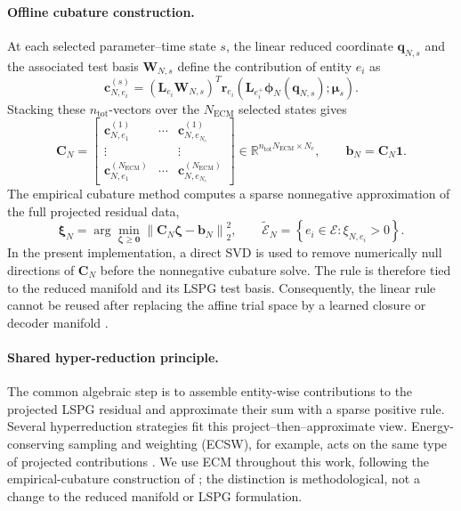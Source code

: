 \documentclass[11pt]{article}
\begin{document}
\paragraph{Offline cubature construction.}
At each selected parameter--time state $s$, the linear reduced coordinate
$\mathbf q_{N,s}$ and the associated test basis $\mathbf W_{N,s}$ define the
contribution of entity $e_i$ as
\begin{equation}
\mathbf c_{N,e_i}^{(s)}
=
\left(\mathbf L_{e_i}\mathbf W_{N,s}\right)^T
\mathbf r_{e_i}
\!\left(\mathbf L_{e_i^+}\boldsymbol\phi_N(\mathbf q_{N,s});\bm\mu_s\right).
\label{eq:linear-ecm-training-contribution}
\end{equation}
Stacking these $n_{\mathrm{tot}}$-vectors over the $N_{\mathrm{ECM}}$
selected states gives
\begin{equation}
\mathbf C_N=
\begin{bmatrix}
\mathbf c_{N,e_1}^{(1)} & \cdots & \mathbf c_{N,e_{N_e}}^{(1)}\\
\vdots & & \vdots\\
\mathbf c_{N,e_1}^{(N_{\mathrm{ECM}})} & \cdots &
\mathbf c_{N,e_{N_e}}^{(N_{\mathrm{ECM}})}
\end{bmatrix}
\in\mathbb R^{n_{\mathrm{tot}}N_{\mathrm{ECM}}\times N_e},
\qquad
\mathbf b_N=\mathbf C_N\mathbf 1.
\label{eq:linear-ecm-training-matrix}
\end{equation}
The empirical cubature method computes a sparse nonnegative approximation of
the full projected residual data,
\begin{equation}
\boldsymbol\xi_N
=
\arg\min_{\boldsymbol\zeta\geq\mathbf0}
\left\|\mathbf C_N\boldsymbol\zeta-\mathbf b_N\right\|_2^2,
\qquad
\widetilde{\mathcal E}_N
=\left\{e_i\in\mathcal E:\xi_{N,e_i}>0\right\}.
\label{eq:linear-ecm-cubature}
\end{equation}
In the present implementation, a direct SVD is used to remove numerically
null directions of $\mathbf C_N$ before the nonnegative cubature solve. The
rule is therefore tied to the reduced manifold and its LSPG test basis.
Consequently, the linear rule cannot be reused after replacing the affine
trial space by a learned closure or decoder manifold
\cite{hernandez2017dimensional,hernandez2020multiscale,de2023hyper,ares2026closure}.

\paragraph{Shared hyper-reduction principle.}
The common algebraic step is to assemble entity-wise contributions to the
projected LSPG residual and approximate their sum with a sparse positive
rule.  Several hyperreduction strategies fit this project--then--approximate
view.  Energy-conserving sampling and weighting (ECSW), for example, acts on
the same type of projected contributions \cite{farhat2015structure}.  We use
ECM throughout this work, following the empirical-cubature construction of
\cite{hernandez2017dimensional,hernandez2020multiscale}; the distinction is
methodological, not a change to the reduced manifold or LSPG formulation.
\end{document}
